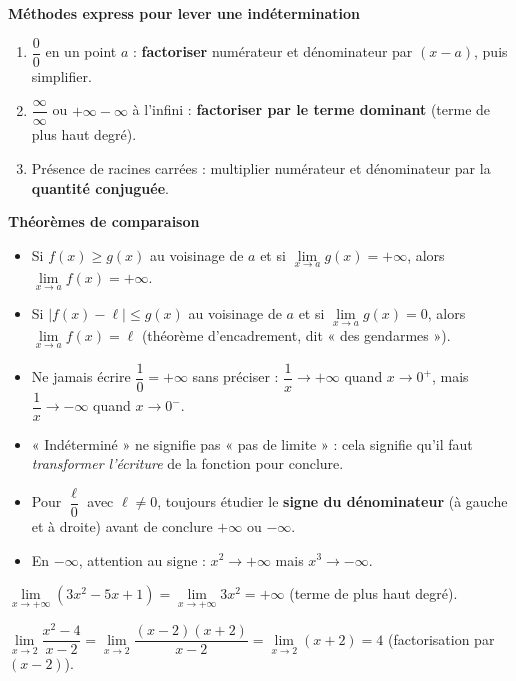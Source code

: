 \documentclass[11pt]{article}
\begin{document}
\begin{aretenir}
\textbf{Méthodes express pour lever une indétermination}
\begin{enumerate}
\item $\dfrac{0}{0}$ en un point $a$ : \textbf{factoriser} numérateur et dénominateur par $(x-a)$, puis simplifier.
\item $\dfrac{\infty}{\infty}$ ou $+\infty-\infty$ à l'infini : \textbf{factoriser par le terme dominant} (terme de plus haut degré).
\item Présence de racines carrées : multiplier numérateur et dénominateur par la \textbf{quantité conjuguée}.
\end{enumerate}

\textbf{Théorèmes de comparaison}
\begin{itemize}
\item Si $f(x)\geq g(x)$ au voisinage de $a$ et si $\lim\limits_{x\to a} g(x) = +\infty$, alors $\lim\limits_{x\to a} f(x) = +\infty$.
\item Si $|f(x)-\ell|\leq g(x)$ au voisinage de $a$ et si $\lim\limits_{x\to a} g(x) = 0$, alors $\lim\limits_{x\to a} f(x) = \ell$ (théorème d'encadrement, dit « des gendarmes »).
\end{itemize}
\end{aretenir}

\begin{attention}
\begin{itemize}
\item Ne jamais écrire $\dfrac{1}{0}=+\infty$ sans préciser : $\dfrac{1}{x}\to +\infty$ quand $x\to 0^+$, mais $\dfrac{1}{x}\to -\infty$ quand $x\to 0^-$.
\item « Indéterminé » ne signifie pas « pas de limite » : cela signifie qu'il faut \emph{transformer l'écriture} de la fonction pour conclure.
\item Pour $\dfrac{\ell}{0}$ avec $\ell\neq 0$, toujours étudier le \textbf{signe du dénominateur} (à gauche et à droite) avant de conclure $+\infty$ ou $-\infty$.
\item En $-\infty$, attention au signe : $x^2\to +\infty$ mais $x^3\to -\infty$.
\end{itemize}
\end{attention}

\begin{exemplebox}
$\lim\limits_{x\to +\infty}(3x^2-5x+1)=\lim\limits_{x\to +\infty}3x^2=+\infty$ (terme de plus haut degré).

$\lim\limits_{x\to 2}\dfrac{x^2-4}{x-2}=\lim\limits_{x\to 2}\dfrac{(x-2)(x+2)}{x-2}=\lim\limits_{x\to 2}(x+2)=4$ (factorisation par $(x-2)$).
\end{exemplebox}
\end{document}
